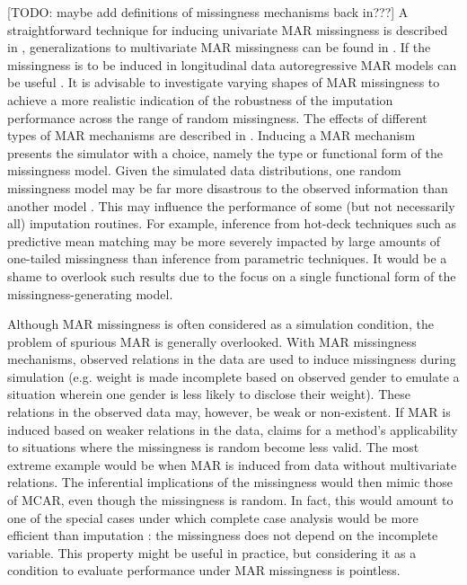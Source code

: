 \documentclass[bimj,fleqn]{w-art}
\begin{document}
[TODO: maybe add definitions of missingness mechanisms back in???] A straightforward technique for inducing univariate MAR missingness is described in \citet[][\S 3.2.4]{buur18}, generalizations to multivariate MAR missingness can be found in \citet{ampute}. If the missingness is to be induced in longitudinal data autoregressive MAR models can be useful \citep[see e.g.][model 2 and model 3]{shara2015randomly}. It is advisable to investigate varying shapes of MAR missingness to achieve a more realistic indication of the robustness of the imputation performance across the range of random missingness. The effects of different types of MAR mechanisms are described in \citet{scho18}. Inducing a MAR mechanism presents the simulator with a choice, namely the type or functional form of the missingness model. Given the simulated data distributions, one random missingness model may be far more disastrous to the observed information than another model \citep{scho18}. This may influence the performance of some (but not necessarily all) imputation routines. For example, inference from hot-deck techniques such as predictive mean matching \citep{little1988missing, rubin1986statistical} may be more severely impacted by large amounts of one-tailed missingness than inference from parametric techniques. It would be a shame to overlook such results due to the focus on a single functional form of the missingness-generating model.

Although MAR missingness is often considered as a simulation condition, the problem of spurious MAR is generally overlooked. With MAR missingness mechanisms, observed relations in the data are used to induce missingness during simulation (e.g. weight is made incomplete based on observed gender to emulate a situation wherein one gender is less likely to disclose their weight). These relations in the observed data may, however, be weak or non-existent. If MAR is induced based on weaker relations in the data, claims for a method's applicability to situations where the missingness is random become less valid. The most extreme example would be when MAR is induced from data without multivariate relations. The inferential implications of the missingness would then mimic those of MCAR, even though the missingness is random. In fact, this would amount to one of the special cases under which complete case analysis would be more efficient than imputation \citep[see e.g.][\S 2.7]{buur18}: the missingness does not depend on the incomplete variable. This property might be useful in practice, but considering it as a condition to evaluate performance under MAR missingness is pointless. 
\end{document}

